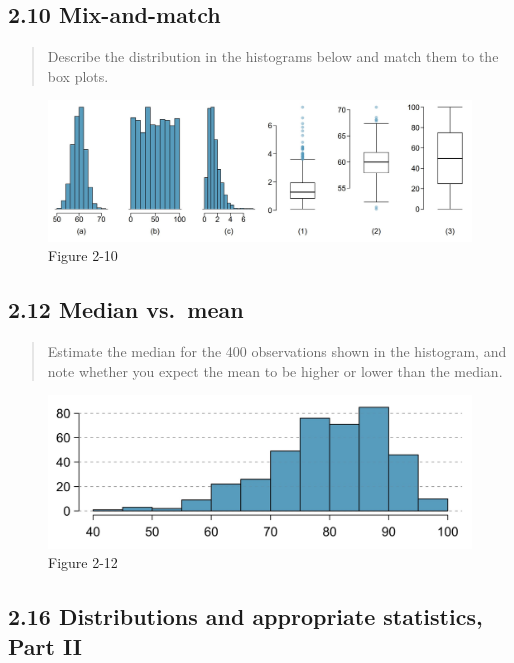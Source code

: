 \documentclass[
]{article}
\begin{document}
\subsection{2.10 Mix-and-match}\label{mix-and-match}

\begin{quote}
Describe the distribution in the histograms below and match them to the
box plots.
\end{quote}

\begin{figure}
\centering
\includegraphics{./assets/2-10.jpg}
\caption{Figure 2-10}
\end{figure}

\subsection{2.12 Median vs.~mean}\label{median-vs.-mean}

\begin{quote}
Estimate the median for the 400 observations shown in the histogram, and
note whether you expect the mean to be higher or lower than the median.
\end{quote}

\begin{figure}
\centering
\includegraphics{./assets/2-12.jpg}
\caption{Figure 2-12}
\end{figure}

\subsection{2.16 Distributions and appropriate statistics, Part
II}\label{distributions-and-appropriate-statistics-part-ii}
\end{document}
